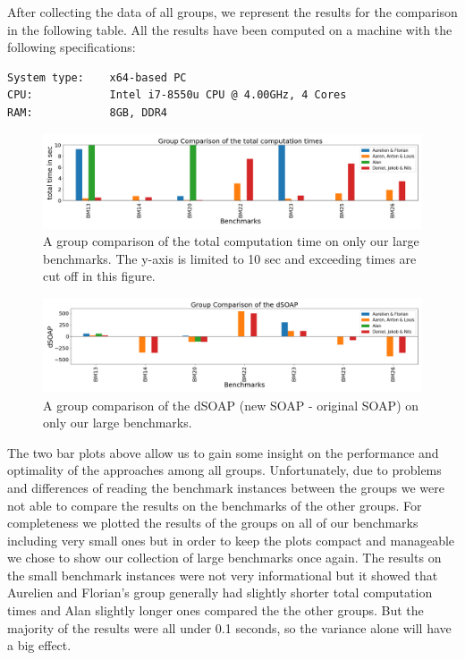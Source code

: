 \documentclass{llncs}
\begin{document}
After collecting the data of all groups, we represent the results for the comparison in the following table. All the results have been computed on a machine with the following specifications:
\begin{verbatim}
System type:    x64-based PC
CPU:            Intel i7-8550u CPU @ 4.00GHz, 4 Cores
RAM:            8GB, DDR4
\end{verbatim}
\newpage
\begin{figure}
    \centering
    \includegraphics[scale=0.24]{images/comparison/group_comparison_total.png}
    \caption{A group comparison of the total computation time on only our large benchmarks. The y-axis is limited to 10 sec and exceeding times are cut off in this figure.}
    \label{fig:my_label}
\end{figure}
\begin{figure}
    \centering
    \includegraphics[scale=0.24]{images/comparison/group_comparison_SOAP.png}
    \caption{A group comparison of the dSOAP (new SOAP - original SOAP) on only our large benchmarks.}
    \label{fig:my_label}
\end{figure}

The two bar plots above allow us to gain some insight on the performance and optimality of the approaches among all groups. Unfortunately, due to problems and differences of reading the benchmark instances between the groups we were not able to compare the results on the benchmarks of the other groups. For completeness we plotted the results of the groups on all of our benchmarks including very small ones but in order to keep the plots compact and manageable we chose to show our collection of large benchmarks once again. The results on the small benchmark instances were not very informational but it showed that Aurelien and Florian's group \cite{project2} generally had slightly shorter total computation times and Alan \cite{project3} slightly longer ones compared the the other groups. But the majority of the results were all under 0.1 seconds, so the variance alone will have a big effect.
\end{document}
